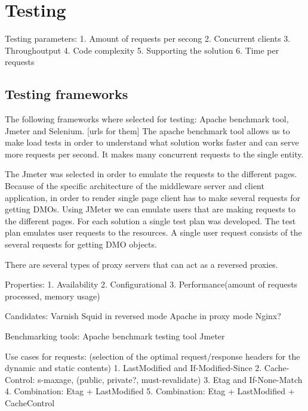 \section{Testing}

Testing parameters:
1. Amount of requests per secong
2. Concurrent clients
3. Throughoutput
4. Code complexity
5. Supporting the solution
6. Time per requests

% 

\subsection{Testing frameworks}

The following frameworks where selected for testing: Apache benchmark tool, Jmeter and Selenium. [urls for them]
The apache benchmark tool allows us to make load tests in order to understand what solution works faster and can serve more requests per second. It makes many concurrent requests to the single entity.

The Jmeter was selected in order to emulate the requests to the different pages. Because of the specific architecture of the middleware server and client application, in order to render single page client has to make several requests for getting DMOs. Using JMeter we can emulate users that are making requests to the different pages. 
For each solution a single test plan was developed. The test plan emulates user requests to the resources. A single user request consists of the several requests for getting DMO objects. 


There are several types of proxy servers that can act as a reversed proxies.

Properties:
1. Availability
2. Configurational
3. Performance(amount of requests processed, memory usage)

Candidates:
Varnish
Squid in reversed mode
Apache in proxy mode
Nginx?

Benchmarking tools:
Apache benchmark testing tool
Jmeter

Use cases for requests: (selection of the optimal request/response headers for the dynamic and static contents)
1. LastModified and If-Modified-Since
2. Cache-Control: s-maxage, (public, private?, must-revalidate)
3. Etag and If-None-Match
4. Combination: Etag + LastModified
5. Combination: Etag + LastModified + CacheControl

